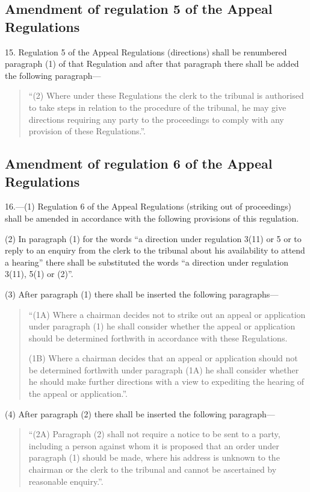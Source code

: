\documentclass[a4paper]{article}
\begin{document}
\subsection[15. Amendment of regulation 5 of the Appeal Regulations]{Amendment of regulation 5 of the Appeal Regulations}

15.  Regulation 5 of the Appeal Regulations (directions) shall be renumbered paragraph (1) of that Regulation and after that paragraph there shall be added the following paragraph—
\begin{quotation}
“(2) Where under these Regulations the clerk to the tribunal is authorised to take steps in relation to the procedure of the tribunal, he may give directions requiring any party to the proceedings to comply with any provision of these Regulations.”.
\end{quotation}

\subsection[16. Amendment of regulation 6 of the Appeal Regulations]{Amendment of regulation 6 of the Appeal Regulations}

16.—(1) Regulation 6 of the Appeal Regulations (striking out of proceedings) shall be amended in accordance with the following provisions of this regulation.

(2) In paragraph (1) for the words “a direction under regulation 3(11) or 5 or to reply to an enquiry from the clerk to the tribunal about his availability to attend a hearing” there shall be substituted the words “a direction under regulation 3(11), 5(1) or (2)”.

(3) After paragraph (1) there shall be inserted the following paragraphs—
\begin{quotation}
“(1A) Where a chairman decides not to strike out an appeal or application under paragraph (1) he shall consider whether the appeal or application should be determined forthwith in accordance with these Regulations.

(1B) Where a chairman decides that an appeal or application should not be determined forthwith under paragraph (1A) he shall consider whether he should make further directions with a view to expediting the hearing of the appeal or application.”.
\end{quotation}

(4) After paragraph (2) there shall be inserted the following paragraph—
\begin{quotation}
“(2A) Paragraph (2) shall not require a notice to be sent to a party, including a person against whom it is proposed that an order under paragraph (1) should be made, where his address is unknown to the chairman or the clerk to the tribunal and cannot be ascertained by reasonable enquiry.”.
\end{quotation}
\end{document}
